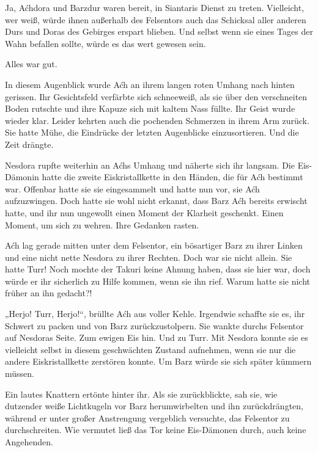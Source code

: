 Ja, Aćhdora und Barzdur waren bereit, in Siantaris Dienst zu treten. Vielleicht, wer weiß, würde ihnen außerhalb des Felsentors auch das Schicksal aller anderen Durs und Doras des Gebirges erspart blieben. Und selbst wenn sie eines Tages der Wahn befallen sollte, würde es das wert gewesen sein.

Alles war gut.



\trennzeichen



In diesem Augenblick wurde Aćh an ihrem langen roten Umhang nach hinten gerissen. Ihr Gesichtsfeld verfärbte sich schneeweiß, als sie über den verschneiten Boden rutschte und ihre Kapuze sich mit kaltem Nass füllte. Ihr Geist wurde wieder klar. Leider kehrten auch die pochenden Schmerzen in ihrem Arm zurück. Sie hatte Mühe, die Eindrücke der letzten Augenblicke einzusortieren. Und die Zeit drängte.

Nesdora rupfte weiterhin an Aćhs Umhang und näherte sich ihr langsam. Die Eis-Dämonin hatte die zweite Eiskristallkette in den Händen, die für Aćh bestimmt war. Offenbar hatte sie sie eingesammelt und hatte nun vor, sie Aćh aufzuzwingen. Doch hatte sie wohl nicht erkannt, dass Barz Aćh bereits erwischt hatte, und ihr nun ungewollt einen Moment der Klarheit geschenkt. Einen Moment, um sich zu wehren. Ihre Gedanken rasten.

Aćh lag gerade mitten unter dem Felsentor, ein bösartiger Barz zu ihrer Linken und eine nicht nette Nesdora zu ihrer Rechten. Doch war sie nicht allein. Sie hatte Turr! Noch mochte der Takuri keine Ahnung haben, dass sie hier war, doch würde er ihr sicherlich zu Hilfe kommen, wenn sie ihn rief. Warum hatte sie nicht früher an ihn gedacht?!

„Herjo! Turr, Herjo!“, brüllte Aćh aus voller Kehle. Irgendwie schaffte sie es, ihr Schwert zu packen und von Barz zurückzustolpern. Sie wankte durchs Felsentor auf Nesdoras Seite. Zum ewigen Eis hin. Und zu Turr. Mit Nesdora konnte sie es vielleicht selbst in diesem geschwächten Zustand aufnehmen, wenn sie nur die andere Eiskristallkette zerstören konnte. Um Barz würde sie sich später kümmern müssen.

Ein lautes Knattern ertönte hinter ihr. Als sie zurückblickte, sah sie, wie dutzender weiße Lichtkugeln vor Barz herumwirbelten und ihn zurückdrängten, während er unter großer Anstrengung vergeblich versuchte, das Felsentor zu durchschreiten. Wie vermutet ließ das Tor keine Eis-Dämonen durch, auch keine Angehenden.

